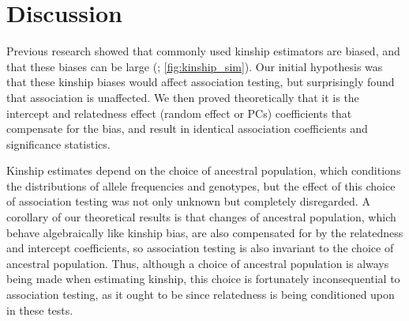 \documentclass[11pt]{article}
\begin{document}
\section{Discussion}

Previous research showed that commonly used kinship estimators are biased, and that these biases can be large (\citet{ochoa_estimating_2021}; \cref{fig:kinship_sim}).
Our initial hypothesis was that these kinship biases would affect association testing, but surprisingly found that association is unaffected.
We then proved theoretically that it is the intercept and relatedness effect (random effect or PCs) coefficients that compensate for the bias, and result in identical association coefficients and significance statistics.

Kinship estimates depend on the choice of ancestral population, which conditions the distributions of allele frequencies and genotypes, but the effect of this choice of association testing was not only unknown but completely disregarded.
A corollary of our theoretical results is that changes of ancestral population, which behave algebraically like kinship bias, are also compensated for by the relatedness and intercept coefficients, so association testing is also invariant to the choice of ancestral population.
Thus, although a choice of ancestral population is always being made when estimating kinship, this choice is fortunately inconsequential to association testing, as it ought to be since relatedness is being conditioned upon in these tests.
\end{document}
